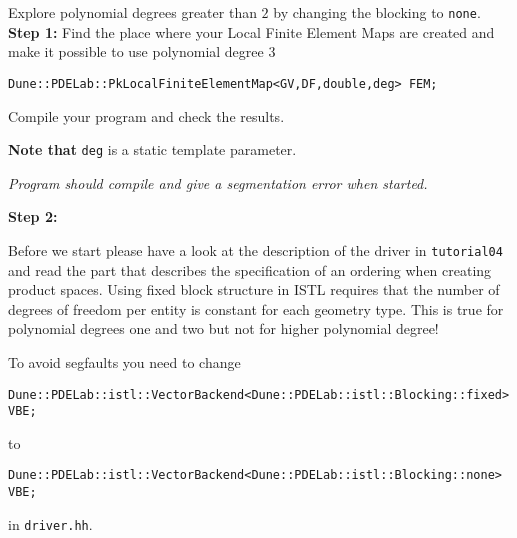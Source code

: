 \documentclass[12pt,a4paper]{article}
\begin{document}
\begin{Exercise}{Explore polynomial degrees greater than $2$ by
    changing the blocking to \lstinline{none}.}
  \textbf{Step 1:} Find the place where your Local Finite Element Maps
  are created and make it possible to use polynomial degree 3

  \begin{lstlisting}
Dune::PDELab::PkLocalFiniteElementMap<GV,DF,double,deg> FEM;
  \end{lstlisting}

  Compile your program and check the results.

  \textbf{Note that} \lstinline!deg! is a static template parameter.

  \textit{Program should compile and give a segmentation error when
    started.}

  \textbf{Step 2:}

  Before we start please have a look at the description of the driver
  in \lstinline!tutorial04! and read the part that describes the
  specification of an ordering when creating product spaces. Using
  fixed block structure in ISTL requires that the number of degrees of
  freedom per entity is constant for each geometry type. This is true
  for polynomial degrees one and two but not for higher polynomial
  degree!

  To avoid segfaults you need to change
  \begin{lstlisting}
Dune::PDELab::istl::VectorBackend<Dune::PDELab::istl::Blocking::fixed> VBE;
  \end{lstlisting}
  to
  \begin{lstlisting}
Dune::PDELab::istl::VectorBackend<Dune::PDELab::istl::Blocking::none> VBE;
  \end{lstlisting}
  in  \lstinline!driver.hh!.
\end{Exercise}
\end{document}
